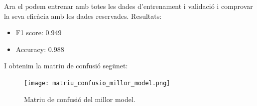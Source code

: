 \documentclass[9pt,a4paper,twoside]{tau-class/tau}
\begin{document}
    Ara el podem entrenar amb totes les dades d'entrenament i validació i comprovar la seva eficàcia amb les dades reservades. Resultats:
    \begin{itemize}
        \item F1 score: 0.949
        \item Accuracy: 0.988
    \end{itemize}
    I obtenim la matriu de confusió segünet:
    \begin{figure}[H]
        \centering
        \texttt{[image: matriu\_confusio\_millor\_model.png]}
        \caption{Matriu de confusió del millor model.}
        \label{fig:figure13}
    \end{figure}

    

\printbibliography

\end{document}
